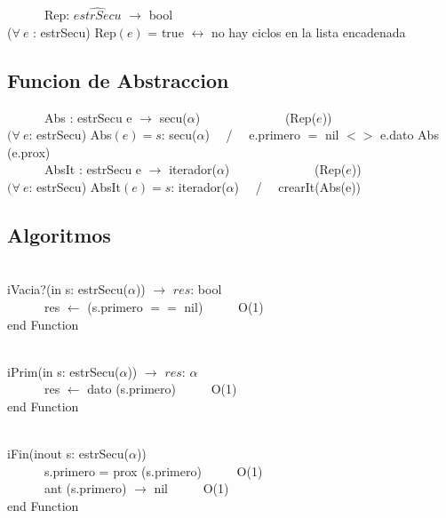 \documentclass[a4paper,10pt]{article}
\newcommand{\sombrero}{\widehat}
\begin{document}
\indent \ \ \ \ \ \ Rep: $\sombrero{estrSecu}$ $\rightarrow$ bool \\
    
($\forall\ e$ : estrSecu) Rep$(e)$ = true $\leftrightarrow$ no hay ciclos en la lista encadenada

\subsection{Funcion de Abstraccion}

\indent \ \ \ \ \ \ Abs : estrSecu e $\rightarrow$ secu($\alpha$) \ \ \ \ \ \ \ \ \ \ \ \ \ (Rep($e$))\\
   
   $(\forall\ e$: estrSecu) {Abs$(e) = s$: secu($\alpha$)} \ \ / \ \ 
   \lif e.primero $=$ nil \lthen $<>$ \lelse e.dato \puntito Abs (e.prox) \lfi\\


\indent \ \ \ \ \ \ AbsIt : estrSecu e $\rightarrow$ iterador($\alpha$) \ \ \ \ \ \ \ \ \ \ \ \ \ (Rep($e$))\\
   
   $(\forall\ e$: estrSecu) {AbsIt$(e) = s$: iterador($\alpha$)} \ \ / \ \  crearIt(Abs(e))


\newpage
\subsection{Algoritmos}

\begin{algoritmo}
\caption{}\\
  iVacia?(in s: estrSecu($\alpha$)) $\rightarrow$ $res$: bool \\
	\indent \ \ \ \ \ \  res $\gets$ (s.primero $==$ nil)  \ \ \ \ \ O(1)\\
   end Function 
\end{algoritmo}

\begin{algoritmo}
\caption{}\\
  iPrim(in s: estrSecu($\alpha$)) $\rightarrow$ $res$: $\alpha$ \\
	\indent \ \ \ \ \ \  res $\gets$ dato (s.primero)  \ \ \ \ \ O(1)\\
   end Function 
\end{algoritmo}

\begin{algoritmo}
\caption{}\\
  iFin(inout s: estrSecu($\alpha$))\\
	\indent \ \ \ \ \ \  s.primero = prox (s.primero)  \ \ \ \ \ O(1)\\
	\indent \ \ \ \ \ \  ant (s.primero)  $\rightarrow$  nil  \ \ \ \ \ O(1)\\

   end Function 
\end{algoritmo}
\end{document}
